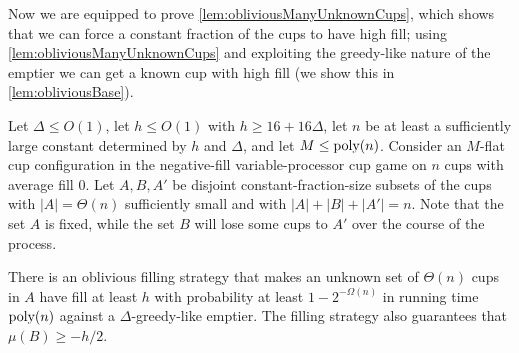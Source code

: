 Now we are equipped to prove \cref{lem:obliviousManyUnknownCups},
which shows that we can force a constant fraction of the cups to
have high fill; using \cref{lem:obliviousManyUnknownCups} and
exploiting the greedy-like nature of the emptier we can get a
known cup with high fill (we show this in
\cref{lem:obliviousBase}).
\begin{lemma}
  \label{lem:obliviousManyUnknownCups}
  Let $\Delta \le O(1)$, let $h \le O(1)$ with $h \ge
  16+16\Delta$, let $n$ be at least a sufficiently large constant
  determined by $h$ and $\Delta$, and let $M \le \operatorname{\text{poly}}(n)$.
  Consider an $M$-flat cup configuration in the negative-fill
  variable-processor cup game on $n$ cups with average fill $0$.
  Let $A, B, A'$ be disjoint constant-fraction-size subsets of
  the cups with $|A| = \Theta(n)$ sufficiently small and with
  $|A| + |B| + |A'| = n$. Note that the set $A$ is fixed, while
  the set $B$ will lose some cups to $A'$ over the course of
  the process.

  There is an oblivious filling strategy that makes an unknown
  set of $\Theta(n)$ cups in $A$ have fill at least $h$ with
  probability at least $1-2^{-\Omega(n)}$ in running time
  $\operatorname{\text{poly}}(n)$ against a $\Delta$-greedy-like emptier.
  The filling strategy also guarantees that $\mu(B) \ge -h/2$.
\end{lemma}
